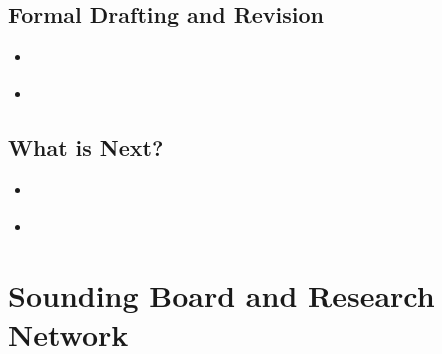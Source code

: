 \documentclass[11pt]{article}
\begin{document}
\subsection{Formal Drafting and Revision}
\begin{itemize}
\item \begin{exercise}
\end{exercise}

\vspace{20pt}
\item \begin{exercise}
\end{exercise}
\end{itemize}
\subsection{What is Next?}
\begin{itemize}
\item \begin{exercise}
\end{exercise}

\vspace{20pt}
\item \begin{exercise}
\end{exercise}
\end{itemize}

\newpage
\section{Sounding Board and Research Network}
\end{document}
